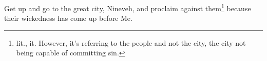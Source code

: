 
\begin{inparaenum}
     Get up and go to the great city, Nineveh, and proclaim against them\footnote{lit., it. However, it's referring to the people and not the city, the city not being capable of committing sin.} because their wickedness has come up before Me.%
    
\end{inparaenum}
